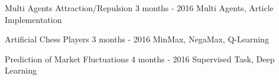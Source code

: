 


\begin{cventries}

\cvproject
{Multi Agents Attraction/Repulsion} %
{3 months - 2016} %
{ %
    Multi Agents, Article Implementation
}




\cvproject
{Artificial Chess Players} %
{3 months - 2016} %
{ %
    MinMax, NegaMax, Q-Learning
}


\cvproject
{Prediction of Market Fluctuations} %
{4 months - 2016} %
{ %
    Supervised Task, Deep Learning
}


\end{cventries}
